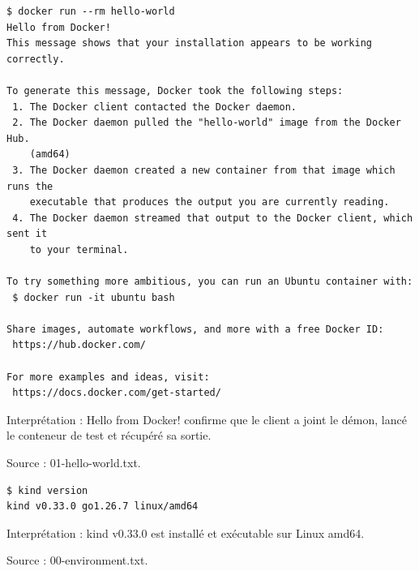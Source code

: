 \documentclass[11pt,a4paper]{article}
\begin{document}
\par\medskip\noindent\begin{minipage}{\linewidth}
\par\vspace{4pt}\noindent\begin{minipage}{\linewidth}
\begin{Verbatim}[breaklines=true,breakanywhere=true,fontsize=\footnotesize,frame=single,framesep=8pt,rulecolor=\color{teal}]
$ docker run --rm hello-world
Hello from Docker!
This message shows that your installation appears to be working correctly.

To generate this message, Docker took the following steps:
 1. The Docker client contacted the Docker daemon.
 2. The Docker daemon pulled the "hello-world" image from the Docker Hub.
    (amd64)
 3. The Docker daemon created a new container from that image which runs the
    executable that produces the output you are currently reading.
 4. The Docker daemon streamed that output to the Docker client, which sent it
    to your terminal.

To try something more ambitious, you can run an Ubuntu container with:
 $ docker run -it ubuntu bash

Share images, automate workflows, and more with a free Docker ID:
 https://hub.docker.com/

For more examples and ideas, visit:
 https://docs.docker.com/get-started/
\end{Verbatim}
\end{minipage}\par\vspace{6pt}

Interprétation : Hello from Docker! confirme que le client a joint le démon, lancé le conteneur de test et récupéré sa sortie.

{\footnotesize\color{teal} Source : 01-hello-world.txt.\par}
\end{minipage}\par\medskip

\par\medskip\noindent\begin{minipage}{\linewidth}
\par\vspace{4pt}\noindent\begin{minipage}{\linewidth}
\begin{Verbatim}[breaklines=true,breakanywhere=true,fontsize=\footnotesize,frame=single,framesep=8pt,rulecolor=\color{teal}]
$ kind version
kind v0.33.0 go1.26.7 linux/amd64
\end{Verbatim}
\end{minipage}\par\vspace{6pt}

Interprétation : kind v0.33.0 est installé et exécutable sur Linux amd64.

{\footnotesize\color{teal} Source : 00-environment.txt.\par}
\end{minipage}\par\medskip
\end{document}
